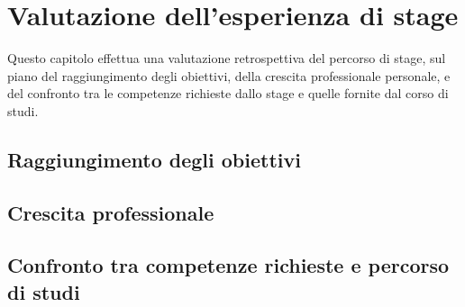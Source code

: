 \chapter{Valutazione dell'esperienza di stage}
\label{chap:valutazione}

Questo capitolo effettua una valutazione retrospettiva del percorso di stage, sul piano del raggiungimento degli obiettivi, della crescita professionale personale, e del confronto tra le competenze richieste dallo stage e quelle fornite dal corso di studi.

\section{Raggiungimento degli obiettivi}
\label{sec:raggiungimento-obiettivi}




\section{Crescita professionale}
\label{sec:crescita-professionale}




\section{Confronto tra competenze richieste e percorso di studi}
\label{sec:confronto-competenze}


